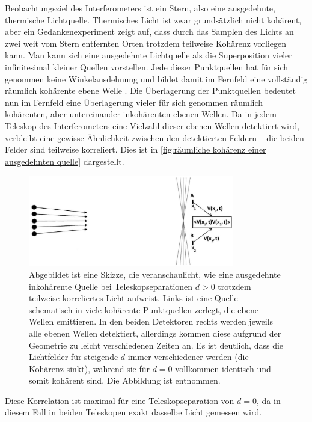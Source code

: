 Beobachtungsziel des Interferometers ist ein Stern, also eine ausgedehnte, thermische Lichtquelle. 
Thermisches Licht ist zwar grundsätzlich nicht kohärent, aber ein Gedankenexperiment zeigt auf, dass durch das Samplen des Lichts an zwei weit vom Stern entfernten Orten trotzdem teilweise Kohärenz vorliegen kann. 
Man kann sich eine ausgedehnte Lichtquelle als die Superposition vieler infinitesimal kleiner Quellen vorstellen. 
Jede dieser Punktquellen hat für sich genommen keine Winkelausdehnung und bildet damit im Fernfeld eine vollständig räumlich kohärente ebene Welle \cite[Kap. 6.1]{foxQuantumOpticsIntroduction2006}. 
Die Überlagerung der Punktquellen bedeutet nun im Fernfeld eine Überlagerung vieler für sich genommen räumlich kohärenten, aber untereinander inkohärenten ebenen Wellen. 
Da in jedem Teleskop des Interferometers eine Vielzahl dieser ebenen Wellen detektiert wird, verbleibt eine gewisse Ähnlichkeit zwischen den detektierten Feldern -- die beiden Felder sind teilweise korreliert. 
Dies ist in \autoref{fig:räumliche kohärenz einer ausgedehnten quelle} dargestellt. 
\begin{figure}[h]
    \centering
    \includegraphics[width=0.8\textwidth]{images/Theorie/Burke_9.25.png}
    \caption{Abgebildet ist eine Skizze, die veranschaulicht, wie eine ausgedehnte inkohärente Quelle bei Teleskopseparationen $d>0$ trotzdem teilweise korreliertes Licht aufweist. Links ist eine Quelle schematisch in viele kohärente Punktquellen zerlegt, die ebene Wellen emittieren. In den beiden Detektoren rechts werden jeweils alle ebenen Wellen detektiert, allerdings kommen diese aufgrund der Geometrie zu leicht verschiedenen Zeiten an. Es ist deutlich, dass die Lichtfelder für steigende $d$ immer verschiedener werden (die Kohärenz sinkt), während sie für $d=0$ vollkommen identisch und somit kohärent sind. Die Abbildung ist \cite[Fig. 9.25]{burkeIntroductionRadioAstronomy2019} entnommen.}
    \label{fig:räumliche kohärenz einer ausgedehnten quelle}
\end{figure}
Diese Korrelation ist maximal für eine Teleskopseparation von $d=0$, da in diesem Fall in beiden Teleskopen exakt dasselbe Licht gemessen wird. 
